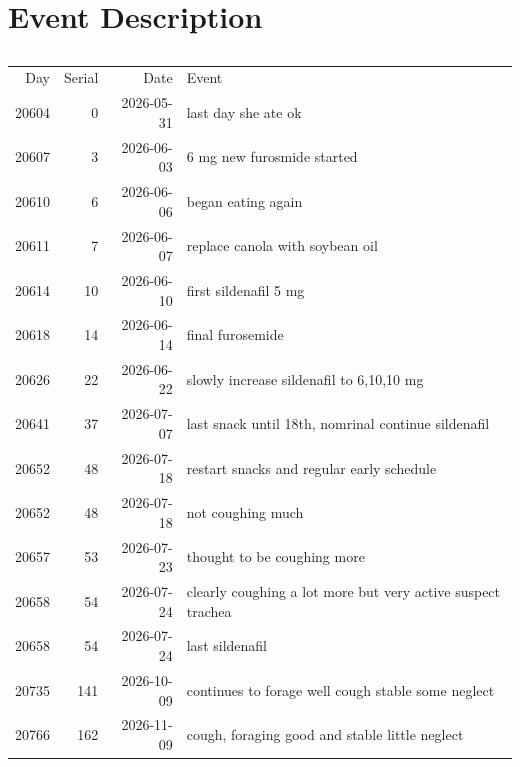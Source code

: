 \newcommand{\eventtable}{
\begin{table}[H] \centering
\begin{tabular}{|r|r|r|l|}
\hline
Day & Serial & Date & Event \\
20604 & 0 & 2026-05-31 &last day she ate ok \\
20607 &  3 & 2026-06-03 &6 mg new furosmide started \\ 
20610 & 6 & 2026-06-06 &began eating again \\ 
20611 & 7 & 2026-06-07 &replace canola with soybean oil \\ 
20614 & 10 & 2026-06-10 &first sildenafil  5 mg  \\
20618 & 14 & 2026-06-14 &final  furosemide \\
20626 & 22 & 2026-06-22 &slowly increase  sildenafil to  6,10,10 mg  \\
20641 & 37 & 2026-07-07 &last snack until 18th, nomrinal continue  sildenafil \\
20652 & 48 & 2026-07-18 &restart snacks and regular early schedule \\ 
20652 & 48 & 2026-07-18 &not coughing much  \\ 
20657  &53 &  2026-07-23 &thought to be coughing more  \\ 
20658 & 54 & 2026-07-24 &clearly coughing a lot more  but very active suspect trachea  \\ 
20658 & 54 & 2026-07-24 &last sildenafil   \\ 
20735 & 141 & 2026-10-09 &continues to forage well cough stable some neglect   \\ 
20766 & 162 & 2026-11-09 &cough, foraging good and  stable little  neglect   \\ 
\hline
\end{tabular}
\caption{}
\end{table}
} %


\section{Event Description  }

\eventtable

